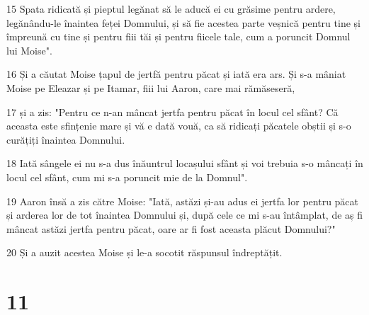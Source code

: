 \par 15 Spata ridicată și pieptul legănat să le aducă ei cu grăsime pentru ardere, legănându-le înaintea feței Domnului, și să fie acestea parte veșnică pentru tine și împreună cu tine și pentru fiii tăi și pentru fiicele tale, cum a poruncit Domnul lui Moise".
\par 16 Și a căutat Moise țapul de jertfă pentru păcat și iată era ars. Și s-a mâniat Moise pe Eleazar și pe Itamar, fiii lui Aaron, care mai rămăseseră,
\par 17 și a zis: "Pentru ce n-an mâncat jertfa pentru păcat în locul cel sfânt? Că aceasta este sfințenie mare și vă e dată vouă, ca să ridicați păcatele obștii și s-o curățiți înaintea Domnului.
\par 18 Iată sângele ei nu s-a dus înăuntrul locașului sfânt și voi trebuia s-o mâncați în locul cel sfânt, cum mi s-a poruncit mie de la Domnul".
\par 19 Aaron însă a zis către Moise: "Iată, astăzi și-au adus ei jertfa lor pentru păcat și arderea lor de tot înaintea Domnului și, după cele ce mi s-au întâmplat, de aș fi mâncat astăzi jertfa pentru păcat, oare ar fi fost aceasta plăcut Domnului?"
\par 20 Și a auzit acestea Moise și le-a socotit răspunsul îndreptățit.

\chapter{11}

